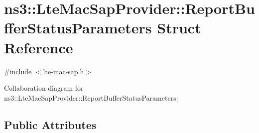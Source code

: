\hypertarget{structns3_1_1LteMacSapProvider_1_1ReportBufferStatusParameters}{}\section{ns3\+:\+:Lte\+Mac\+Sap\+Provider\+:\+:Report\+Buffer\+Status\+Parameters Struct Reference}
\label{structns3_1_1LteMacSapProvider_1_1ReportBufferStatusParameters}


{\ttfamily \#include $<$lte-\/mac-\/sap.\+h$>$}



Collaboration diagram for ns3\+:\+:Lte\+Mac\+Sap\+Provider\+:\+:Report\+Buffer\+Status\+Parameters\+:
\subsection*{Public Attributes}

